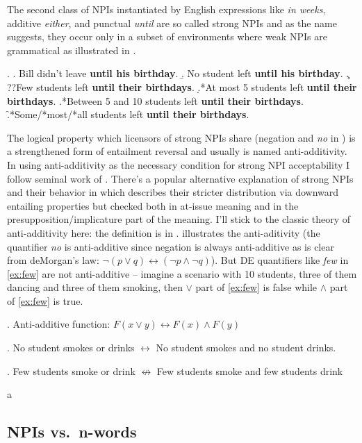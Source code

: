 \documentclass[12pt]{scrartcl}
\begin{document}
The second class of NPIs instantiated by English expressions like  \emph{in weeks}, additive \emph{either}, and punctual \emph{until} are so called strong NPIs and as the name suggests, they occur only in a subset of environments where weak NPIs are grammatical as illustrated in \Next.


\ex. \a. Bill didn't leave \textbf{until his birthday}. \b. No student
left \textbf{until his birthday}. \c. ??Few students left \textbf{until
their birthdays}. \d.*At most 5 students left \textbf{until their
birthdays}. \e.*Between 5 and 10 students left \textbf{until their
birthdays}. \f.*Some/*most/*all students left \textbf{until their
birthdays}.

The logical property which licensors of strong NPIs share (negation and \textit{no} in \Last) is a strengthened form of entailment reversal and usually is named anti-additivity. In using anti-additivity as the necessary condition for strong NPI acceptability I follow seminal work of \cite{zwarts1998three}. There's a popular alternative explanation of strong NPIs and their behavior in \cite{gajewski2011licensing} which describes their stricter distribution via downward entailing properties but checked both in at-issue meaning and in the presupposition/implicature part of the meaning. I'll stick to the classic theory of anti-additivity here: the definition is in \Next. \NNext illustrates the anti-aditivity (the quantifier \textit{no} is anti-additive since negation is always anti-additive as is clear from deMorgan's law: $\neg(p \vee q) \leftrightarrow (\neg p \wedge \neg q)$). But DE quantifiers like \textit{few} in \ref{ex:few} are not anti-additive -- imagine a scenario with 10 students, three of them dancing and three of them smoking, then $\vee$ part of \ref{ex:few} is false while $\wedge$ part of \ref{ex:few} is true.



\ex. Anti-additive function:
\(F(x \vee y) \leftrightarrow F(x) \wedge F(y)\)

\ex. No student smokes or drinks \(\leftrightarrow\) No student smokes
and no student drinks.

\ex. Few students smoke or drink \(\not\leftrightarrow\) Few students
smoke and few students drink \label{ex:few}

a

\hypertarget{npis-vs.n-words-modularity}{%
\subsection{NPIs vs.~n-words}\label{npis-vs.n-words-modularity}}
\end{document}
